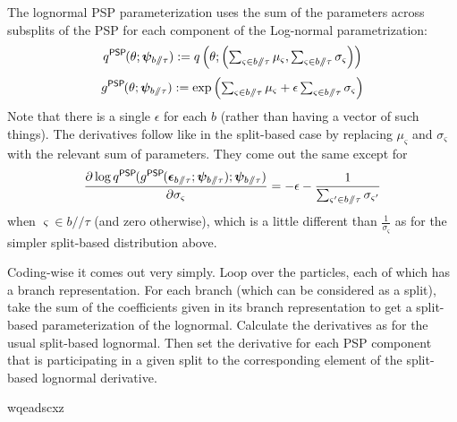 \documentclass{article}
\newcommand{\psp}{\slash\!\!\slash}
\newcommand{\qPSP}{q^\textsf{PSP}\hspace{-1pt}}
\newcommand{\gPSP}{g^\textsf{PSP}\hspace{-1pt}}
\begin{document}
The lognormal PSP parameterization uses the sum of the parameters across subsplits of the PSP for each component of the Log-normal parametrization:
\[
\qPSP(\theta; \bm\psi_{b \psp \tau}) :=
q\left(\theta; \left(
        \textstyle\sum_{\varsigma \in b \psp \tau} \mu_\varsigma,
        \textstyle\sum_{\varsigma \in b \psp \tau} \sigma_\varsigma
    \right)\right)
\]
\[
\gPSP(\theta; \bm\psi_{b \psp \tau}) :=
    \exp \left(
        \textstyle\sum_{\varsigma \in b \psp \tau} \mu_\varsigma +
        \epsilon
        \textstyle\sum_{\varsigma \in b \psp \tau} \sigma_\varsigma
    \right)
\]
Note that there is a single $\epsilon$ for each $b$ (rather than having a vector of such things).
The derivatives follow like in the split-based case by replacing $\mu_\varsigma$ and $\sigma_\varsigma$ with the relevant sum of parameters.
They come out the same except for
\[
    \frac
    {\partial \log \qPSP(\gPSP(\bm\epsilon_{b \psp \tau}; \bm\psi_{b \psp \tau}); \bm\psi_{b \psp \tau})}
    {\partial \sigma_{\varsigma}}
    =
    - \epsilon
    - \frac{1}{\textstyle\sum_{\varsigma' \in b \psp \tau} \sigma_{\varsigma'}}
\]
when $\varsigma \in b \psp \tau$ (and zero otherwise), which is a little different than $\frac{1}{\sigma_\varsigma}$ as for the simpler split-based distribution above.

Coding-wise it comes out very simply.
Loop over the particles, each of which has a branch representation.
For each branch (which can be considered as a split), take the sum of the coefficients given in its branch representation to get a split-based parameterization of the lognormal.
Calculate the derivatives as for the usual split-based lognormal.
Then set the derivative for each PSP component that is participating in a given split to the corresponding element of the split-based lognormal derivative.


wqeadscxz\nocite{vbpi}



\end{document}

